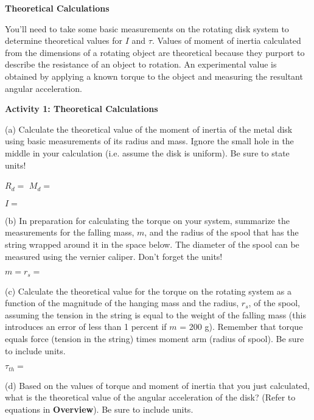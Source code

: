 \textbf{Theoretical Calculations} 

You'll need to take some basic measurements on the rotating disk system
to determine theoretical values for $I$ and \( \tau  \). Values of moment of
inertia calculated from the dimensions of a rotating object are theoretical
because they purport to describe the resistance of an object to rotation. An
experimental value is obtained by applying a known torque to the object and
measuring the resultant angular acceleration.

\newpage

\textbf{Activity 1: Theoretical Calculations }

(a) Calculate the theoretical value of the moment of inertia of the metal disk
using basic measurements of its radius and mass. Ignore the small hole in the
middle in your calculation (i.e. assume the disk is uniform). Be sure to state 
units!
\vspace{5mm}

\( R_{d} =\) \hfill{}\( M_{d}= \) \hfill{}
\vspace{5mm}

\( I = \) 
\answerspace{5mm}

(b) In preparation for calculating the torque on your system, summarize the
measurements for the falling mass, $m$, and the radius of the spool that has the string wrapped around it in the space below. The diameter of the spool can be measured using the vernier caliper. Don't forget the units!
\vspace{5mm}

$m = $\hfill{}\(r_{s}= \)\hfill{} 
\answerspace{5mm}

(c) Calculate the theoretical value for the torque on the rotating system as
a function of the magnitude of the hanging mass and the radius, \( r_{s} \),
of the spool, assuming the tension in the string is equal to the weight of the 
falling mass (this introduces an error of less than 1 percent if $m$ = 200 g). 
Remember that torque equals force (tension in the string) times 
moment arm (radius of spool). Be sure to include units.
\vspace{5mm}

\( \tau _{th}= \)
\answerspace{5mm}

(d) Based on the values of torque and moment of inertia that you just 
calculated, what is the theoretical value of the angular acceleration of the 
disk? (Refer to equations in \textbf{Overview}). Be sure to include units.
\vspace{5mm}

